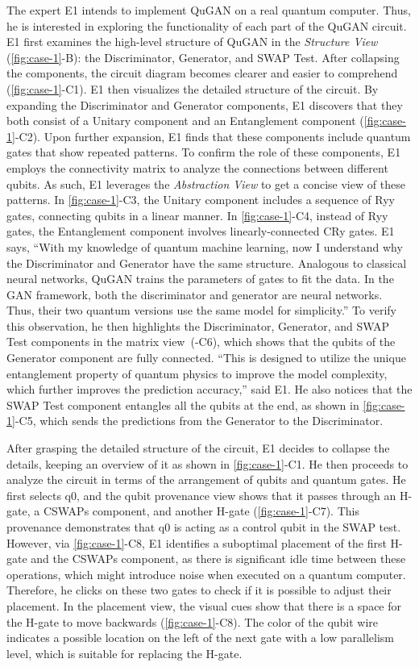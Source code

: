 The expert E1 intends to implement QuGAN on a real quantum computer. Thus, he is interested in exploring the functionality of each part of the QuGAN circuit. 
E1 first examines the high-level structure of QuGAN in the \emph{Structure View} (\cref{fig:case-1}-B): the Discriminator, Generator, and SWAP Test.
After collapsing the components, the circuit diagram becomes clearer and easier to comprehend (\cref{fig:case-1}-C1).
E1 then visualizes the detailed structure of the circuit.
By expanding the Discriminator and Generator components, E1 discovers that they both consist of a Unitary component and an Entanglement component (\cref{fig:case-1}-C2).
Upon further expansion, E1 finds that these components include quantum gates that show repeated patterns.
To confirm the role of these components, E1 employs the connectivity matrix to analyze the connections between different qubits.
As such, E1 leverages the \emph{Abstraction View} to get a concise view of these patterns. In \cref{fig:case-1}-C3, the Unitary component includes a sequence of Ryy gates, connecting qubits in a linear manner. In \cref{fig:case-1}-C4, instead of Ryy gates, the Entanglement component involves linearly-connected CRy gates. E1 says, ``With my knowledge of quantum machine learning, now I understand why the Discriminator and Generator have the same structure. Analogous to classical neural networks, QuGAN trains the parameters of gates to fit the data. In the GAN framework, both the discriminator and generator are neural networks. Thus, their two quantum versions use the same model for simplicity.'' 
To verify this observation, he then highlights the Discriminator, Generator, and SWAP Test components in the matrix view~(-C6), which shows
that the qubits of the Generator component are fully connected. ``This is designed to utilize the unique entanglement property of quantum physics to improve the model complexity, which further improves the prediction accuracy,'' said E1. He also notices that the SWAP Test component entangles all the qubits at the end, as shown in \cref{fig:case-1}-C5, which sends the predictions from the Generator to the Discriminator.

After grasping the detailed structure of the circuit, E1 decides to collapse the details, keeping an overview of it as shown in \cref{fig:case-1}-C1.
He then proceeds to analyze the circuit in terms of the arrangement of qubits and quantum gates.
He first selects q0, and the qubit provenance view shows that it passes through an H-gate, a CSWAPs component, and another H-gate (\cref{fig:case-1}-C7).
This provenance demonstrates that q0 is acting as a control qubit in the SWAP test.
However, via \cref{fig:case-1}-C8, E1 identifies a suboptimal placement of the first H-gate and the CSWAPs component, as there is significant idle time between these operations, which might introduce noise when executed on a quantum computer.
Therefore, he clicks on these two gates to check if it is possible to adjust their placement.
In the placement view, the visual cues show that there is a space for the H-gate to move backwards (\cref{fig:case-1}-C8).
The color of the qubit wire indicates a possible location on the left of the next gate with a low parallelism level, which is suitable for replacing the H-gate. 

